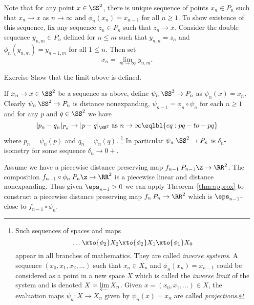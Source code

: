 Note that for any point $x\in \SS^2$, there is unique sequence of points $x_n\in P_n$ such that $x_n\to x$ as $n\to\infty$ and $\phi_n(x_n)=x_{n-1}$ for all $n\ge 1$.
To show existence of this sequence, fix any sequence $z_n\in P_n$ such that $z_n\to x$.
Consider the double sequence $y_{n,m}\in P_n$ defined for $n\le m$ such that $y_{n,n}=z_n$ and
$\phi_n(y_{n,m})= y_{n-1,m}$ for all $1\le n$.
Then set 
$$x_n=\lim_{m\to\infty} y_{n,m}.$$

\begin{thm}{Exercise}\label{ex:limit-above}
Show that the limit above is defined.
\end{thm}

If $x_n\to x\in \SS^2$ be a sequence as above,
define $\psi_n\:\SS^2\to P_n$ as $\psi_n(x)=x_n$.
Clearly $\psi_n\:\SS^2\to P_n$ is distance nonexpanding, 
$\psi_{n-1}=\phi_n\circ\psi_{n}$ for each $n\ge 1$
and for any $p$ and $q\in\SS^2$ we have
$$|p_n-q_n|_{P_n}\to |p-q|_{\SS^2}\ \text{as}\  n\to\infty\eqlbl{eq:pq-to-pq}$$
where $p_n=\psi_n(p)$ and $q_n=\psi_n(q)$.%
\footnote{Such sequences of spaces and maps 
$$\dots\xto{\phi_{2}}X_2\xto{\phi_{2}} X_1\xto{\phi_{1}}X_0$$
appear in all branches of mathematics. 
They are called \emph{inverse systems}.
A sequence $(x_0, x_1, x_2, \ldots)$ such that $x_n \in X_n$ and $\phi_n(x_n)=x_{n-1}$ could be considered as a point in a new space $X$ which is called the \emph{inverse limit} of the system and is denoted $X=\varprojlim X_n$. 
Given $x=(x_0,x_1,\dots )\in X$, the evaluation maps $\psi_n: X \to X_n$ given by $\psi_n(x)=x_n$ are called \emph{projections}.}
In particular $\psi_n\:\SS^2\to P_n$ is $\delta_n$-isometry for some sequence $\delta_n\to0+$.

Assume we have a piecewise distance preserving map $f_{n-1}\: P_{n-1}\z\to \RR^2$.
The composition $f_{n-1}\circ\phi_n\: P_n\z\to\RR^2$ is a piecewise linear and distance nonexpanding. 
Thus given $\eps_{n-1}>0$ we can apply Theorem~\ref{thm:approx} to construct a piecewise distance preserving map $f_n\:P_n\to\RR^2$ which is $\eps_{n-1}$-close to $f_{n-1}\circ\phi_n$.

